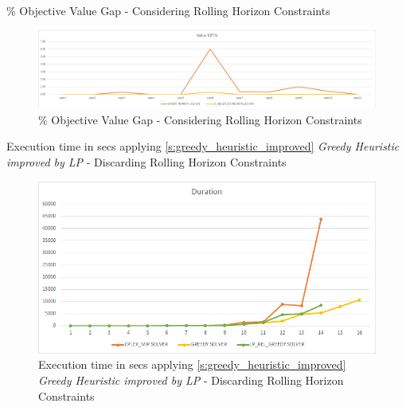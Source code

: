 \documentclass[11pt]{article}
\begin{document}
{\begin{landscape}
        \begin{table}[htb]
                \centering
                \caption[Short Caption for LoT]{\% Objective Value Gap - Considering Rolling Horizon Constraints}\label{table:tbl_test_obj_diff_with_rh_ph2}
        \end{table}
        \begin{figure}[htp]
            \centering
            \includegraphics[width=20cm]{value_diff_with_rh}
            \caption{\% Objective Value Gap - Considering Rolling Horizon Constraints}
            \label{fig:fig_value_diff_with_rh}
        \end{figure}
    \end{landscape}
\newpage
    \clearpage%
    \thispagestyle{empty}%
    \begin{landscape}%
        \begin{table}[htb]
                \centering
                \caption[Short Caption for LoT]{Execution time in secs applying \ref{s:greedy_heuristic_improved} \textit{Greedy Heuristic improved by LP} - Discarding Rolling Horizon Constraints}\label{table:tbl_test_durations_bett_no_rh}
        \end{table}
        \begin{figure}[htp]
            \centering
            \includegraphics[width=12cm]{durations_bett_no_rh}
            \caption{Execution time in secs applying \ref{s:greedy_heuristic_improved} \textit{Greedy Heuristic improved by LP} - Discarding Rolling Horizon Constraints}
            \label{fig:fig_durations_bett_no_rh}
        \end{figure}


\end{landscape}}
\end{document}
